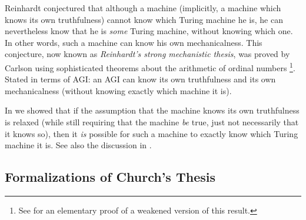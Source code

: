 \documentclass[runningheads]{llncs}
\begin{document}
Reinhardt conjectured that although a machine (implicitly, a machine which
knows its own truthfulness) cannot know which Turing machine he is, he can
nevertheless know that he is \emph{some} Turing machine, without knowing
which one. In other words, such a machine can know his own mechanicalness.
This conjecture, now known as \emph{Reinhardt's strong mechanistic thesis}, was
proved by Carlson \cite{carlson} using sophisticated theorems about the
arithmetic of ordinal numbers \cite{carlson1999}\footnote{See
\cite{alexander2015fast} for an elementary proof of a weakened version of
this result.}. Stated in terms of AGI: an AGI can know its own truthfulness
and its own mechanicalness (without knowing exactly which machine it is).

In \cite{alexander2014machine} we showed that if the assumption that the
machine knows its own truthfulness is relaxed (while still requiring that
the machine \emph{be} true, just not necessarily that it knows so),
then it \emph{is} possible for such a machine to exactly know which
Turing machine it is. See also the discussion in \cite{aldini2015theory}.



\subsection{Formalizations of Church's Thesis}
\end{document}
